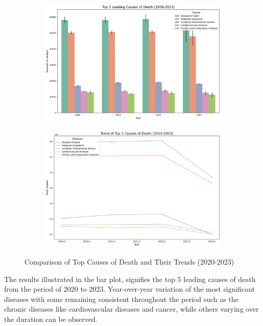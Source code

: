 \documentclass[a4paper,10pt]{article}
\begin{document}
\begin{figure}[ht!]
	\centering
	\begin{subfigure}[t]{0.48\textwidth}
		\centering
		\includegraphics[width=\textwidth]{images/graph-2.png} %
		\label{fig:comparison-bar}
	\end{subfigure}
	\hfill
	\begin{subfigure}[t]{0.48\textwidth}
		\centering
		\includegraphics[width=\textwidth]{images/graph-3.png} %
		\label{fig:comparison-trend}
	\end{subfigure}
	\caption{Comparison of Top Causes of Death and Their Trends (2020-2023)}
\end{figure}

The results illustrated in the bar plot, signifies the top 5 leading causes of death from the period of 2020 to 2023. Year-over-year variation of the most significant diseases with some remaining consistent throughout the period such as the chronic diseases like cardiovascular diseases and cancer, while others varying over the duration can be observed.
\end{document}
